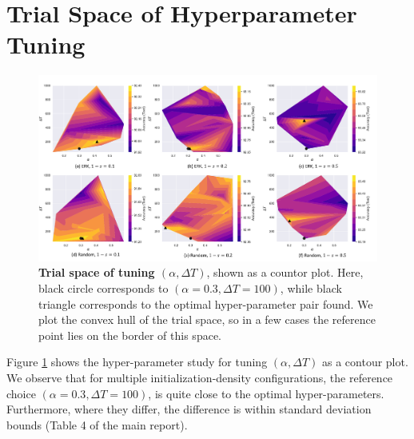 \section{Trial Space of Hyperparameter Tuning}

\begin{figure}[!h]
    \centering
    \includegraphics[width=\textwidth]{supplementary_sections/alpha_delta_contour.pdf}
    \captionsetup{aboveskip=\figureaboveskip,belowskip=\figurebelowskip}
    \caption{\textbf{Trial space of tuning $(\alpha, \Delta T)$}, shown as a countor plot. Here, black circle corresponds to $(\alpha=0.3,\Delta T = 100)$, while black triangle corresponds to the optimal hyper-parameter pair found. We plot the convex hull of the trial space, so in a few cases the reference point lies on the border of this space.}
    \label{fig:alpha-deltaT-contour}
\end{figure}

Figure \ref{fig:alpha-deltaT-contour} shows the hyper-parameter study for tuning $(\alpha, \Delta T)$ as a contour plot. We observe that for multiple initialization-density configurations, the reference choice $(\alpha=0.3,\Delta T = 100)$, is quite close to the optimal hyper-parameters. Furthermore, where they differ, the difference is within standard deviation bounds (Table 4 of the main report).